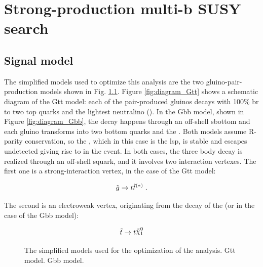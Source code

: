 \chapter{Strong-production multi-b SUSY search}
\label{chap:strong_prod}


\section{Signal model}
\label{sec:strong:signalmodel}

The simplified models used to optimize this analysis are the two gluino-pair-production models shown in Fig. \ref{fig:strong_diagram}. 
Figure \ref{fig:diagram_Gtt} shows a schematic diagram of the Gtt model: 
each of the pair-produced gluinos decays with 100\% \gls{br} to two top quarks and the lightest neutralino (\ninoone).
In the Gbb model, shown in Figure \ref{fig:diagram_Gbb}, the decay happens through an off-shell sbottom and each gluino transforms into 
two bottom quarks and the \ninoone. Both models assume R-parity conservation, so the \ninoone, which in this case is the \gls{lsp}, is stable 
and escapes undetected giving rise to \met in the event. In both cases, the three body decay is realized through an off-shell squark, 
and it involves two interaction vertexes. The first one is a strong-interaction vertex, in the case of the Gtt model:

\begin{equation*}
\tilde{g} \to t \tilde{t}^{(*)} \; .
\end{equation*}

\noindent The second is an electroweak vertex, originating from the decay of the \stop (or \sbottom in the case of the Gbb model):

\begin{equation*}
\stop \to t \ninoone
\end{equation*}

\begin{figure}[h]
\centering 
{}
\caption{The simplified models used for the optimization of the analysis.  Gtt model.  Gbb model.
}\label{fig:strong_diagram}
\end{figure}


